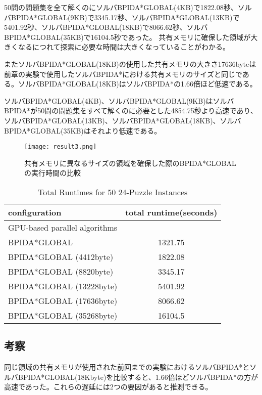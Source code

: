 \documentclass[a4paper,11pt,oneside,openany]{jsbook}
\begin{document}
50問の問題集を全て解くのにソルバBPIDA*GLOBAL(4KB)で1822.08秒、ソルバBPIDA*GLOBAL(9KB)で3345.17秒、ソルバBPIDA*GLOBAL(13KB)で5401.92秒、ソルバBPIDA*GLOBAL(18KB)で8066.62秒、ソルバBPIDA*GLOBAL(35KB)で16104.5秒であった。
共有メモリに確保した領域が大きくなるにつれて探索に必要な時間は大きくなっていることがわかる。

またソルバBPIDA*GLOBAL(18KB)の使用した共有メモリの大きさ17636byteは前章の実験で使用したソルバBPIDA*における共有メモリのサイズと同じである。ソルバBPIDA*GLOBAL(18KB)はソルバBPIDA*の1.66倍ほど低速である。


ソルバBPIDA*GLOBAL(4KB)、ソルバBPIDA*GLOBAL(9KB)はソルバBPIDA*が50問の問題集をすべて解くのに必要とした4854.75秒より高速であり、ソルバBPIDA*GLOBAL(13KB)、ソルバBPIDA*GLOBAL(18KB)、ソルバBPIDA*GLOBAL(35KB)はそれより低速である。

\begin{figure}[H]
\begin{center}
\texttt{[image: result3.png]}
\caption{共有メモリに異なるサイズの領域を確保した際のBPIDA*GLOBALの実行時間の比較}
\end{center}
\end{figure}

\begin{table}[H]
\centering
\caption{Total Runtimes for 50 24-Puzzle Instances}
\label{my-label}
\begin{tabular}{|l|c|}
\hline
configuration & \multicolumn{1}{l|}{total runtime(seconds)} \\ \hline
\multicolumn{2}{|l|}{GPU-based parallel algorithms} \\ \hline
BPIDA*GLOBAL    & 1321.75  \\
BPIDA*GLOBAL (4412byte) & 1822.08  \\
BPIDA*GLOBAL (8820byte) &  3345.17 \\
BPIDA*GLOBAL (13228byte) & 5401.92 \\
BPIDA*GLOBAL (17636byte) & 8066.62 \\
BPIDA*GLOBAL (35268byte) & 16104.5 \\ \hline
\end{tabular}
\end{table}

\subsection{考察}
同じ領域の共有メモリが使用された前回までの実験におけるソルバBPIDA*とソルバBPIDA*GLOBAL(18Kbyte)を比較すると、1.66倍ほどソルバBPIDA*の方が高速であった。これらの遅延には2つの要因があると推測できる。
\end{document}
